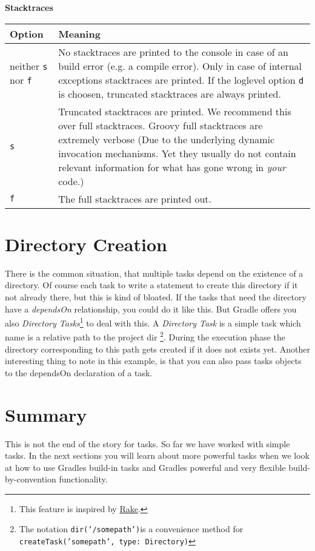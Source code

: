 \centerline{\textbf{Stacktraces}}
\medskip

\begin{tabular}{|l|p{15cm}|} \hline
Option & Meaning  \\ \hline
neither \texttt{s} nor \texttt{f} & No stacktraces are printed to the console in case of an build error (e.g. a compile error). Only in case of internal exceptions stacktraces are printed. If the loglevel option \texttt{d} is choosen, truncated stacktraces are always printed. \\ \hline
\texttt{s} & Truncated stacktraces are printed. We recommend this over full stacktraces. Groovy full stacktraces are extremely verbose (Due to the underlying dynamic invocation mechanisms. Yet they usually do not contain relevant information for what has gone wrong in \emph{your} code.)  \\ \hline
\texttt{f} & The full stacktraces are printed out. \\ \hline
\end{tabular}

\section{Directory Creation} %
There is the common situation, that multiple tasks depend on the existence of a directory. Of course each task to write a statement to create this directory if it not already there, but this is kind of bloated. If the tasks that need the directory have a \emph{dependsOn} relationship, you could do it like this.
But Gradle offers you also \emph{Directory Tasks}\footnote{This feature is inspired by \href{http://rake.rubyforge.org/}{Rake}.} to deal with this.
A \emph{Directory Task} is a simple task which name is a relative path to the project dir
\footnote{The notation \texttt{dir('/somepath')}is a convenience method for \texttt{createTask('somepath', type: Directory)}}. During the execution phase the directory corresponding to this path gets created if it does not exists yet. Another interesting thing to note in this example, is that you can also pass tasks objects to the dependsOn declaration of a task.
\label{sec:directory_creation}


\section{Summary}
This is not the end of the story for tasks. So far we have worked with simple tasks. In the next sections you will learn about more powerful tasks when we look at how to use Gradles build-in tasks and Gradles powerful and very flexible build-by-convention functionality.

